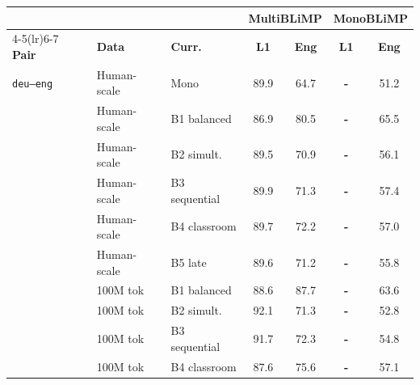 \documentclass[11pt]{article}
\begin{document}
\clearpage
\begin{table}[ht!]
\centering\scriptsize
\setlength{\tabcolsep}{3pt}
\begin{minipage}[t]{0.49\linewidth}\centering
\begin{tabular}{ll l cc cc}
\toprule
& & & \multicolumn{2}{c}{\textbf{MultiBLiMP}} & \multicolumn{2}{c}{\textbf{MonoBLiMP}} \\
\cmidrule(lr){4-5}\cmidrule(lr){6-7}
\textbf{Pair} & \textbf{Data} & \textbf{Curr.} & \textbf{L1} & \textbf{Eng} & \textbf{L1} & \textbf{Eng} \\
\midrule
\texttt{deu--eng} & Human-scale & Mono & \cellcolor[rgb]{0.779,1.000,0.779} 89.9 & \cellcolor[rgb]{0.920,1.000,0.920} 64.7 & \textbf{-} & \cellcolor[rgb]{0.990,1.000,0.990} 51.2 \\
 & Human-scale & B1 balanced & \cellcolor[rgb]{0.796,1.000,0.796} 86.9 & \cellcolor[rgb]{0.834,1.000,0.834} 80.5 & \textbf{-} & \cellcolor[rgb]{0.872,1.000,0.872} 65.5 \\
 & Human-scale & B2 simult. & \cellcolor[rgb]{0.781,1.000,0.781} 89.5 & \cellcolor[rgb]{0.886,1.000,0.886} 70.9 & \textbf{-} & \cellcolor[rgb]{0.950,1.000,0.950} 56.1 \\
 & Human-scale & B3 sequential & \cellcolor[rgb]{0.779,1.000,0.779} 89.9 & \cellcolor[rgb]{0.884,1.000,0.884} 71.3 & \textbf{-} & \cellcolor[rgb]{0.939,1.000,0.939} 57.4 \\
 & Human-scale & B4 classroom & \cellcolor[rgb]{0.780,1.000,0.780} 89.7 & \cellcolor[rgb]{0.879,1.000,0.879} 72.2 & \textbf{-} & \cellcolor[rgb]{0.942,1.000,0.942} 57.0 \\
 & Human-scale & B5 late & \cellcolor[rgb]{0.781,1.000,0.781} 89.6 & \cellcolor[rgb]{0.884,1.000,0.884} 71.2 & \textbf{-} & \cellcolor[rgb]{0.952,1.000,0.952} 55.8 \\
\addlinespace[1.5pt]
 & 100M tok & B1 balanced & \cellcolor[rgb]{0.786,1.000,0.786} 88.6 & \cellcolor[rgb]{0.794,1.000,0.794} 87.7 & \textbf{-} & \cellcolor[rgb]{0.888,1.000,0.888} 63.6 \\
 & 100M tok & B2 simult. & \cellcolor[rgb]{0.767,1.000,0.767} 92.1 & \cellcolor[rgb]{0.884,1.000,0.884} 71.3 & \textbf{-} & \cellcolor[rgb]{0.977,1.000,0.977} 52.8 \\
 & 100M tok & B3 sequential & \cellcolor[rgb]{0.769,1.000,0.769} 91.7 & \cellcolor[rgb]{0.878,1.000,0.878} 72.3 & \textbf{-} & \cellcolor[rgb]{0.960,1.000,0.960} 54.8 \\
 & 100M tok & B4 classroom & \cellcolor[rgb]{0.792,1.000,0.792} 87.6 & \cellcolor[rgb]{0.860,1.000,0.860} 75.6 & \textbf{-} & \cellcolor[rgb]{0.942,1.000,0.942} 57.1 \\

\end{tabular}
\end{minipage}
\end{table}
\end{document}
